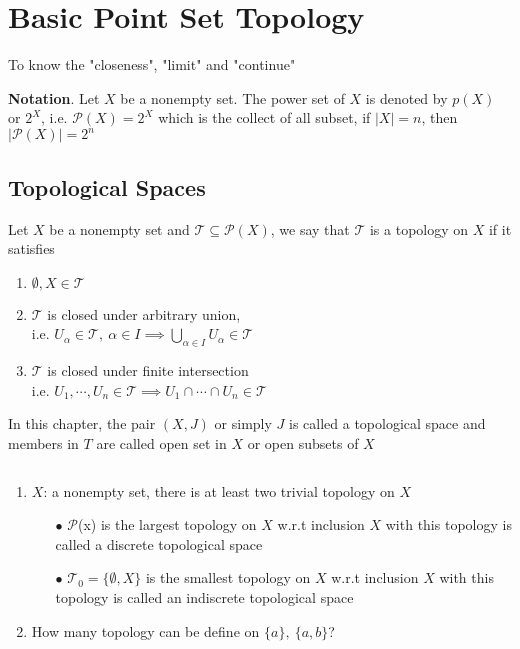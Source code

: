\section{Basic Point Set Topology}

To know the "closeness", "limit" and "continue"

\textbf{Notation}. Let $X$ be a nonempty set. The power set of $X$ is denoted by $p(X)$ or $2^X$, i.e. $\mathscr{P}(X) = 2^X$ which is the collect of all subset, if $|X| = n$, then $|\mathscr{P}(X)| = 2^n$

\subsection{Topological Spaces}

\begin{defn}
	Let $X$ be a nonempty set and $\mathscr{T} \subseteq \mathscr{P}(X)$, we say that $\mathscr{T}$ is a topology on $X$ if it satisfies
	
	\begin{enumerate}
		\item $\emptyset,X \in \mathscr{T}$
		\item $\mathscr{T}$ is closed under arbitrary union, \\i.e. $U_{\alpha} \in \mathscr{T},~\alpha \in I \implies \bigcup_{\alpha \in I} U_{\alpha} \in \mathscr{T}$
		\item $\mathscr{T}$ is closed under finite intersection \\i.e. $U_1,\cdots,U_n \in \mathscr{T} \implies U_1 \cap \cdots \cap U_n \in \mathscr{T}$
	\end{enumerate}
	
	In this chapter, the pair $(X,J)$ or simply $J$ is called a topological space and members in $T$ are called open set in $X$ or open subsets of $X$
\end{defn}

\begin{rmk*}$ $
	\begin{enumerate}
		\item $X$: a nonempty set, there is at least two trivial topology on $X$
			\begin{enumerate}
				\item[$\bullet$] $\mathscr{P}$(x) is the largest topology on $X$ w.r.t inclusion $X$ with this topology is called a discrete topological space
				\item[$\bullet$] $\mathscr{T}_0 = \{\emptyset, X\}$ is the smallest topology on $X$ w.r.t inclusion $X$ with this topology is called an indiscrete topological space
			\end{enumerate}
		\item How many topology can be define on $\{a\},~\{a,b\}$?
	\end{enumerate}
\end{rmk*}

